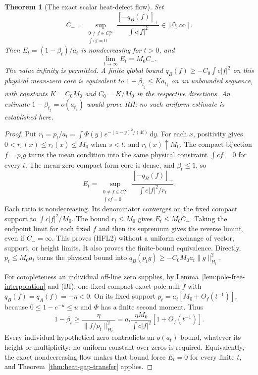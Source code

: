 \documentclass[11pt]{article}
\newtheorem{theorem}{Theorem}
\theoremstyle{remark}\newtheorem{remark}[theorem]{Remark}
\newcommand{\dd}{\,\mathrm d}
\begin{document}
\begin{theorem}[The exact scalar heat-defect flow]
\label{thm:heat-defect-flow}
Set
\[
 C_-=\sup_{\substack{0\ne f\in C_c^\infty\\\int cf=0}}
                      \frac{[-q_B(f)]_+}{\int c|f|^2}
                         \in[0,\infty].
\]
Then $E_t=(1-\beta_t)/a_t$ is nondecreasing for $t>0$, and
\[
                   \lim_{t\to\infty}E_t=M_0C_- .         \tag{HFL2}
\]
The value infinity is permitted. A finite global bound
$q_B(f)\ge-C_0\int c|f|^2$ on this physical mean-zero core
is equivalent to $1-\beta_{t_j}\le K a_{t_j}$ on an
unbounded sequence, with constants $K=C_0M_0$ and
$C_0=K/M_0$ in the respective directions.
An estimate $1-\beta_{t_j}=o(a_{t_j})$ would prove RH;
no such uniform estimate is established here.
\end{theorem}
\begin{proof}
Put $r_t=p_t/a_t=\int\Phi(y)e^{-(x-y)^2/(4t)}\dd y$.
For each $x$, positivity gives $0<r_s(x)\le r_t(x)\le M_0$
when $s<t$, and $r_t(x)\uparrow M_0$.
The compact bijection $f=p_tg$ turns the mean condition
into the same physical constraint $\int cf=0$ for every $t$.
The mean-zero compact form core is dense, and $\beta_t\le1$,
so
\[
 E_t=\sup_{\substack{0\ne f\in C_c^\infty\\\int cf=0}}
             \frac{[-q_B(f)]_+}{\int c|f|^2/r_t}.        \tag{HFL3}
\]
Each ratio is nondecreasing. Its denominator converges on
the fixed compact support to $\int c|f|^2/M_0$.
The bound $r_t\le M_0$ gives $E_t\le M_0C_-$.
Taking the endpoint limit for each fixed $f$ and then its
supremum gives the reverse liminf, even if $C_-=\infty$.
This proves (HFL2) without a uniform exchange of vector,
support, or height limits. It also proves the finite-bound
equivalence. Directly, $p_t\le M_0a_t$ turns the physical
bound into $q_B(p_tg)\ge-C_0M_0a_t\|g\|_{H_t}^2$.

For completeness an individual off-line zero supplies,
by Lemma~\ref{lem:pole-free-interpolation} and (BI), one
fixed compact exact-pole-null $f$ with $q_B(f)=q_A(f)=-\eta<0$.
On its fixed support
$p_t=a_t[M_0+O_f(t^{-1})]$, because
$0\le1-e^{-u}\le u$ and $\Phi$ has a finite second moment.
Thus
\[
 1-\beta_t\ge\frac{\eta}{\|f/p_t\|_{H_t}^2}
   =a_t\frac{\eta M_0}{\int c|f|^2}[1+O_f(t^{-1})].      \tag{HFL4}
\]
Every individual hypothetical zero contradicts an $o(a_t)$
bound, whatever its height or multiplicity; no uniform
constant over zeros is required. Equivalently, the exact
nondecreasing flow makes that bound force $E_t=0$ for every
finite $t$, and Theorem~\ref{thm:heat-gap-transfer} applies.
\end{proof}
\end{document}
